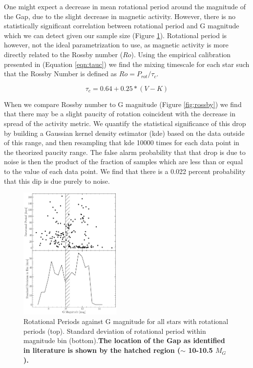 

One might expect a decrease in mean rotational period around the magnitude of
the Gap, due to the slight decrease in magnetic activity. However, there is no
statistically significant correlation between rotational period and G
magnitude which we can detect given our sample size (Figure
\ref{fig:rotationalSignifigance}). Rotational period is however, not the ideal
parametrization to use, as magnetic activity is more directly related to the
Rossby number ($Ro$). Using the empirical calibration presented in
\citet{Wright2018} (Equation \ref{eqn:tauc}) we find the mixing timescale for
each star such that the Rossby Number is defined as $Ro = P_{rot}/\tau_{c}$.

\begin{equation}\label{eqn:tauc}
  \tau_{c} = 0.64 + 0.25 * (V-K)
\end{equation}

When we compare Rossby number to G magnitude (Figure \ref{fig:rossby}) we find
that there may be a slight paucity of rotation coincident with the decrease in
spread of the activity metric. We quantify the statistical significance of this
drop by building a Gaussian kernel density estimator (kde) based on the data
outside of this range, and then resampling that kde 10000 times for each data
point in the theorized paucity range. The false alarm probability that that drop
is due to noise is then the product of the fraction of samples which are less
than or equal to the value of each data point. We find that there is a 0.022
percent probability that this dip is due purely to noise.


\begin{figure}
  \centering
  \includegraphics[width=0.45\textwidth]{figures/RotationSignifigance.pdf}
  \caption{Rotational Periods against G magnitude for all stars with rotational
  periods (top). Standard deviation of rotational period within magnitude bin (bottom).\textbf{The location of the Gap
  as identified in literature is shown by the hatched region ($\sim$ 10-10.5 $M_{G}$).}}
  \label{fig:rotationalSignifigance}
\end{figure}

